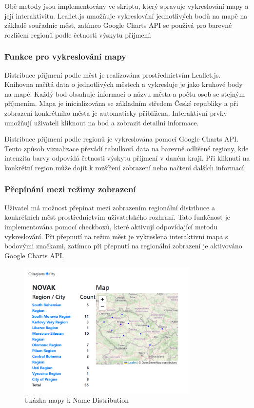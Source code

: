 \documentclass[czech, ba, kiv, he]{fasthesis}
\begin{document}
Obě metody jsou implementovány ve skriptu, který spravuje vykreslování mapy a její interaktivitu. Leaflet.js umožňuje vykreslování jednotlivých bodů na mapě na základě souřadnic měst, zatímco Google Charts API se používá pro barevné rozlišení regionů podle četnosti výskytu příjmení.

\subsubsection{Funkce pro vykreslování mapy}

Distribuce příjmení podle měst je realizována prostřednictvím Leaflet.js. Knihovna načítá data o jednotlivých městech a vykresluje je jako kruhové body na mapě. Každý bod obsahuje informaci o názvu města a počtu osob se stejným příjmením. Mapa je inicializována se základním středem České republiky a při zobrazení konkrétního města je automaticky přiblížena. Interaktivní prvky umožňují uživateli kliknout na bod a zobrazit detailní informace.

Distribuce příjmení podle regionů je vykreslována pomocí Google Charts API. Tento způsob vizualizace převádí tabulková data na barevně odlišené regiony, kde intenzita barvy odpovídá četnosti výskytu příjmení v daném kraji. Při kliknutí na konkrétní region může dojít k rozšíření zobrazení nebo načtení dalších informací.

\subsubsection{Přepínání mezi režimy zobrazení}

Uživatel má možnost přepínat mezi zobrazením regionální distribuce a konkrétních měst prostřednictvím uživatelského rozhraní. Tato funkčnost je implementována pomocí checkboxů, které aktivují odpovídající metodu vykreslování. Při přepnutí na režim měst je vykreslena interaktivní mapa s bodovými značkami, zatímco při přepnutí na regionální zobrazení je aktivováno Google Charts API.

\begin{figure}[h]  
    \centering  
    \includegraphics[width=0.8\textwidth]{name_distribution_map.png}  
    \caption{Ukázka mapy k Name Distribution}  
\end{figure}
\end{document}
